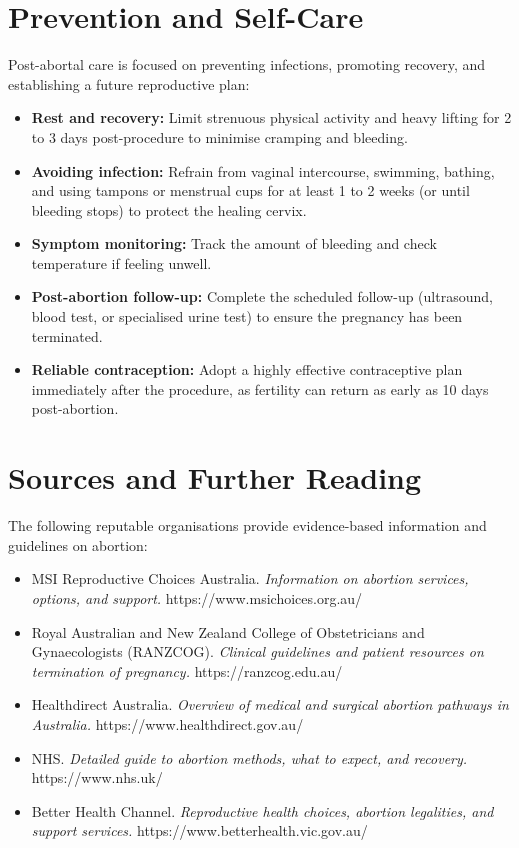 \section*{Prevention and Self-Care}
Post-abortal care is focused on preventing infections, promoting recovery, and establishing a future reproductive plan:
\begin{itemize}
    \item \textbf{Rest and recovery:} Limit strenuous physical activity and heavy lifting for 2 to 3 days post-procedure to minimise cramping and bleeding.
    \item \textbf{Avoiding infection:} Refrain from vaginal intercourse, swimming, bathing, and using tampons or menstrual cups for at least 1 to 2 weeks (or until bleeding stops) to protect the healing cervix.
    \item \textbf{Symptom monitoring:} Track the amount of bleeding and check temperature if feeling unwell.
    \item \textbf{Post-abortion follow-up:} Complete the scheduled follow-up (ultrasound, blood test, or specialised urine test) to ensure the pregnancy has been terminated.
    \item \textbf{Reliable contraception:} Adopt a highly effective contraceptive plan immediately after the procedure, as fertility can return as early as 10 days post-abortion.
\end{itemize}

\section*{Sources and Further Reading}
The following reputable organisations provide evidence-based information and guidelines on abortion:
\begin{itemize}
    \item MSI Reproductive Choices Australia. \textit{Information on abortion services, options, and support.} https://www.msichoices.org.au/
    \item Royal Australian and New Zealand College of Obstetricians and Gynaecologists (RANZCOG). \textit{Clinical guidelines and patient resources on termination of pregnancy.} https://ranzcog.edu.au/
    \item Healthdirect Australia. \textit{Overview of medical and surgical abortion pathways in Australia.} https://www.healthdirect.gov.au/
    \item NHS. \textit{Detailed guide to abortion methods, what to expect, and recovery.} https://www.nhs.uk/
    \item Better Health Channel. \textit{Reproductive health choices, abortion legalities, and support services.} https://www.betterhealth.vic.gov.au/
\end{itemize}
